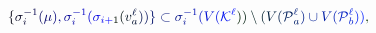 \documentclass[12pt]{article}
\begin{document}
\makeatletter
\renewcommand*{\@textcolor}[3]{%
  \protect\leavevmode
  \begingroup
    \color#1{#2}#3%
  \endgroup
}
\makeatother
\begin{displaymath}
\mathcolor[RGB]{0,0,15}{\{} \mathcolor[RGB]{0,0,30}{\sigma} _ { \mathcolor[RGB]{0,0,45}{i} } ^ { \mathcolor[RGB]{0,0,60}{-} \mathcolor[RGB]{0,0,75}{1} } \mathcolor[RGB]{0,0,90}{(} \mathcolor[RGB]{0,0,105}{\mu} \mathcolor[RGB]{0,0,120}{)} \mathcolor[RGB]{0,0,135}{,} \mathcolor[RGB]{0,0,150}{\sigma} _ { \mathcolor[RGB]{0,0,165}{i} } ^ { \mathcolor[RGB]{0,0,180}{-} \mathcolor[RGB]{0,0,195}{1} } \mathcolor[RGB]{0,0,210}{(} \mathcolor[RGB]{0,0,225}{\sigma} _ { \mathcolor[RGB]{0,0,240}{i} \mathcolor[RGB]{0,0,255}{+} \mathcolor[RGB]{0,15,0}{1} } \mathcolor[RGB]{0,15,15}{(} \mathcolor[RGB]{0,15,30}{v} _ { \mathcolor[RGB]{0,15,45}{a} } ^ { \mathcolor[RGB]{0,15,60}{\ell} } \mathcolor[RGB]{0,15,75}{)} \mathcolor[RGB]{0,15,90}{)} \mathcolor[RGB]{0,15,105}{\}} \mathcolor[RGB]{0,15,120}{\subset} \mathcolor[RGB]{0,15,135}{\sigma} _ { \mathcolor[RGB]{0,15,150}{i} } ^ { \mathcolor[RGB]{0,15,165}{-} \mathcolor[RGB]{0,15,180}{1} } \mathcolor[RGB]{0,15,195}{(} \mathcolor[RGB]{0,15,210}{V} \mathcolor[RGB]{0,15,225}{(} \mathcal { \mathcolor[RGB]{0,15,240}{K} } ^ { \mathcolor[RGB]{0,15,255}{\ell} } \mathcolor[RGB]{0,30,0}{)} \mathcolor[RGB]{0,30,15}{)} \mathcolor[RGB]{0,30,30}{\setminus} \mathcolor[RGB]{0,30,45}{(} \mathcolor[RGB]{0,30,60}{V} \mathcolor[RGB]{0,30,75}{(} \mathcal { \mathcolor[RGB]{0,30,90}{P} } _ { \mathcolor[RGB]{0,30,105}{a} } ^ { \mathcolor[RGB]{0,30,120}{\ell} } \mathcolor[RGB]{0,30,135}{)} \mathcolor[RGB]{0,30,150}{\cup} \mathcolor[RGB]{0,30,165}{V} \mathcolor[RGB]{0,30,180}{(} \mathcal { \mathcolor[RGB]{0,30,195}{P} } _ { \mathcolor[RGB]{0,30,210}{b} } ^ { \mathcolor[RGB]{0,30,225}{\ell} } \mathcolor[RGB]{0,30,240}{)} \mathcolor[RGB]{0,30,255}{)} \mathcolor[RGB]{0,45,0}{,}
\end{displaymath}
\end{document}
